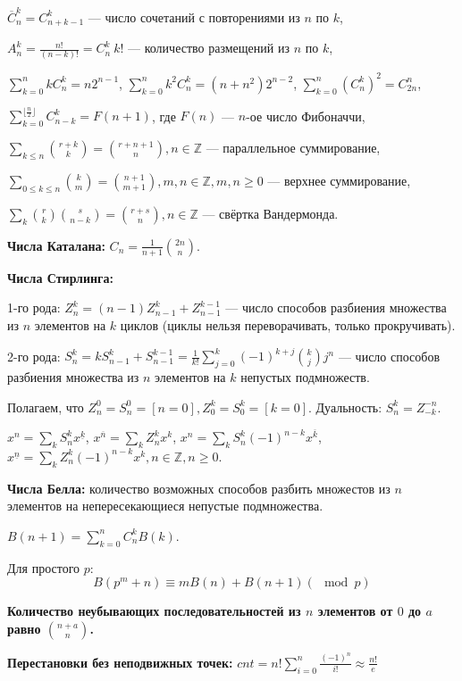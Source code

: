 $\overline{C}_n^k=C_{n + k - 1}^k$ --- число сочетаний с повторениями из $n$ по $k$,

$A_n^k=\frac{n!}{(n-k)!}=C_n^k\:k!$ --- количество размещений из $n$ по $k$,

$\sum\limits_{k=0}^{n}k C_n^k=n2^{n-1}$, $\sum\limits_{k=0}^{n}k^2 C_n^k=(n+n^2)2^{n-2}$,
$\sum\limits_{k=0}^{n}{(C_n^{k})^2}=C_{2n}^n$,

$\sum\limits_{k=0}^{\lfloor\frac{n}{2}\rfloor}C_{n-k}^k=F(n+1)$, где $F(n)$ --- $n$-ое число Фибоначчи,

$\sum\limits_{k\le n} \binom{r+k}{k}=\binom{r+n+1}{n}, n\in \mathbb{Z}$ --- параллельное суммирование,

$\sum\limits_{0\le k\le n} \binom{k}{m} = \binom{n+1}{m+1}, m, n\in \mathbb{Z}, m, n\ge 0$ --- верхнее суммирование,

$\sum\limits_k \binom{r}{k}\binom{s}{n-k}=\binom{r+s}{n}, n\in \mathbb{Z}$ --- свёртка Вандермонда.

\textbf{Числа Каталана:} $\displaystyle C_n = \frac1{n + 1}\binom{2n}{n}$.

\textbf{Числа Стирлинга:}

1-го рода: $Z_n^k =(n-1)Z_{n - 1}^k + Z_{n-1}^{k-1}$ --- число способов разбиения множества из $n$ элементов на $k$ циклов (циклы нельзя переворачивать, только прокручивать).

2-го рода: $S_n^k = kS_{n - 1}^k + S_{n-1}^{k-1} = \frac1{k!} \sum\limits_{j=0}^k (-1)^{k+j}\binom{k}{j}j^n$ --- число способов разбиения множества из $n$ элементов на $k$ непустых подмножеств.

Полагаем, что $Z_n^0=S_n^0=[n=0], Z_0^k=S_0^k=[k=0]$. Дуальность: $S_n^k=Z_{-k}^{-n}$.

$x^n=\sum\limits_k S_n^k x^{\underline{k}}$,
$x^{\overline{n}}=\sum\limits_k Z_n^k x^k$,
$x^n=\sum\limits_k S_n^k (-1)^{n-k} x^{\overline{k}}$,
$x^{\underline{n}}=\sum\limits_k Z_n^k (-1)^{n-k} x^k, n\in \mathbb{Z}, n \ge 0$.

\textbf{Числа Белла:} количество возможных способов разбить множестов из $n$ элементов на непересекающиеся непустые подмножества. 

$B(n + 1) = \sum_{k = 0}^n C_n^k B(k)$. 

Для простого $p$:
$$
  B(p^m + n) \equiv mB(n) + B(n + 1) (\mod p)
$$

\textbf{Количество неубывающих последовательностей из $n$ элементов от $0$ до $a$ равно $\binom{n + a}{n}$.}

\textbf{Перестановки без неподвижных точек:} $cnt = n! \sum\limits_{i = 0}^n \frac{(-1)^n}{i!} \approx \frac{n!}e$

